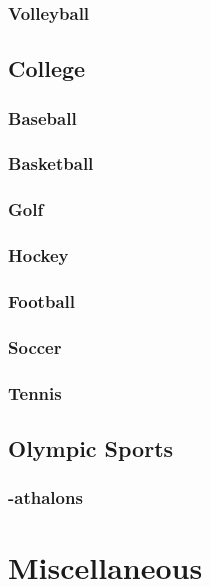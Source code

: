 \documentclass[12pt]{book}
\begin{document}
		\subsection{Volleyball}
		\newpage
	\section{College}
		\subsection{Baseball}
		\subsection{Basketball}
		\subsection{Golf}
		\subsection{Hockey}
		\subsection{Football}
		\subsection{Soccer}
		\subsection{Tennis}
	\section{Olympic Sports}
		\subsection{-athalons}
\chapter{Miscellaneous}
\end{document}
